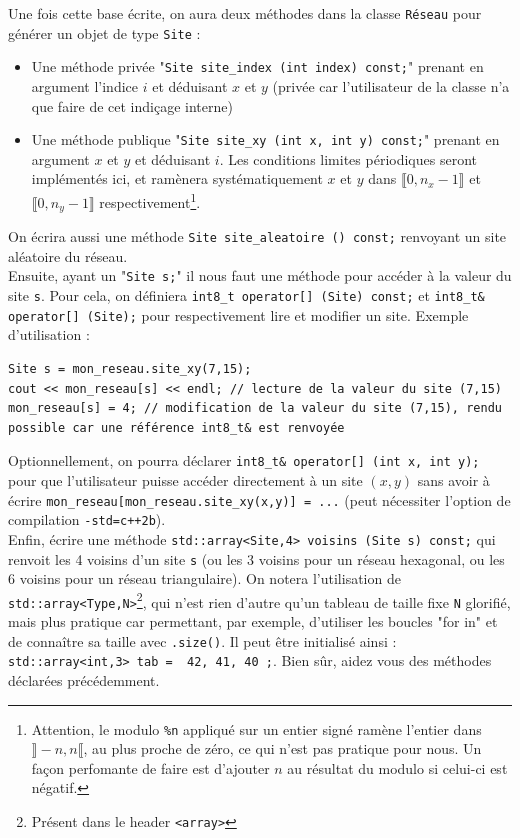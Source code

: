 \documentclass{book}
\newcommand{\inline}[1]{\texttt{#1}}
\begin{document}
Une fois cette base écrite, on aura deux méthodes dans la classe \inline{Réseau} pour générer un objet de type \inline{Site} :
\begin{itemize}
  \item Une méthode privée "\inline{Site site_index (int index) const;}" prenant en argument l'indice $i$ et déduisant $x$ et $y$ (privée car l'utilisateur de la classe n'a que faire de cet indiçage interne)
  \item Une méthode publique "\inline{Site site_xy (int x, int y) const;}" prenant en argument $x$ et $y$ et déduisant $i$. Les conditions limites périodiques seront implémentés ici, et ramènera systématiquement $x$ et $y$ dans $\llbracket 0,n_x\!-\!1 \rrbracket$ et $\llbracket 0,n_y\!-\!1\rrbracket$ respectivement\footnote{Attention, le modulo \texttt{\%n} appliqué sur un entier signé ramène l'entier dans $\rrbracket-n,n\llbracket$, au plus proche de zéro, ce qui n'est pas pratique pour nous. Un façon perfomante de faire est d'ajouter $n$ au résultat du modulo si celui-ci est négatif.}.
\end{itemize}
On écrira aussi une méthode \inline{Site site_aleatoire () const;} renvoyant un site aléatoire du réseau.\\

Ensuite, ayant un "\inline{Site s;}" il nous faut une méthode pour accéder à la valeur du site \inline{s}. Pour cela, on définiera \inline{int8_t operator[] (Site) const;} et \inline{int8_t& operator[] (Site);} pour respectivement lire et modifier un site. Exemple d'utilisation :
\begin{verbatim}
Site s = mon_reseau.site_xy(7,15);
cout << mon_reseau[s] << endl; // lecture de la valeur du site (7,15)
mon_reseau[s] = 4; // modification de la valeur du site (7,15), rendu possible car une référence int8_t& est renvoyée
\end{verbatim}
Optionnellement, on pourra déclarer \inline{int8_t& operator[] (int x, int y);} pour que l'utilisateur puisse accéder directement à un site $(x,y)$ sans avoir à écrire \inline{mon_reseau[mon_reseau.site_xy(x,y)] = ...} (peut nécessiter l'option de compilation \texttt{-std=c++2b}).\\

Enfin, écrire une méthode \inline{std::array<Site,4> voisins (Site s) const;} qui renvoit les 4 voisins d'un site \inline{s} (ou les 3 voisins pour un réseau hexagonal, ou les 6 voisins pour un réseau triangulaire). On notera l'utilisation de \inline{std::array<Type,N>}\footnote{Présent dans le header \texttt{<array>}}, qui n'est rien d'autre qu'un tableau de taille fixe \inline{N} glorifié, mais plus pratique car permettant, par exemple, d'utiliser les boucles "for in" et de connaître sa taille avec \inline{.size()}. Il peut être initialisé ainsi : \inline{std::array<int,3> tab = { 42, 41, 40 };}. Bien sûr, aidez vous des méthodes déclarées précédemment.\\
\end{document}
